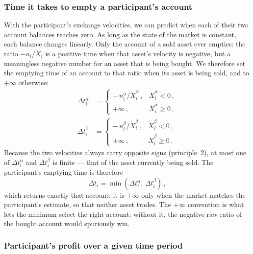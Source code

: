 \documentclass[letterpaper]{article}
\begin{document}
\subsubsection{Time it takes to empty a participant's account}

With the participant's exchange velocities, we can predict when each of their two account balances reaches zero. As long as the state of the market is constant, each balance changes linearly. Only the account of a sold asset ever empties: the ratio $-n_i/\dot{X}_i$ is a positive time when that asset's velocity is negative, but a meaningless negative number for an asset that is being bought. We therefore set the emptying time of an account to that ratio when its asset is being sold, and to $+\infty$ otherwise:
\begin{align}
    \Delta t_i^\alpha &= \begin{cases} -\, n_i^\alpha / \dot{X}_i^\alpha \,, & \dot{X}_i^\alpha < 0 \,,\\ +\infty \,, & \dot{X}_i^\alpha \geq 0 \,, \end{cases} \nonumber\\
    \Delta t_i^\beta &= \begin{cases} -\, n_i^\beta / \dot{X}_i^\beta \,, & \dot{X}_i^\beta < 0 \,,\\ +\infty \,, & \dot{X}_i^\beta \geq 0 \,. \end{cases} \label{eqDeltaT}
\end{align}
Because the two velocities always carry opposite signs (principle~2), at most one of $\Delta t_i^\alpha$ and $\Delta t_i^\beta$ is finite --- that of the asset currently being sold. The participant's emptying time is therefore
\begin{equation}
    \Delta t_i = \min\!\left(\Delta t_i^\alpha,\, \Delta t_i^\beta\right) \,,
\end{equation}
which returns exactly that account; it is $+\infty$ only when the market matches the participant's estimate, so that neither asset trades. The $+\infty$ convention is what lets the minimum select the right account: without it, the negative raw ratio of the bought account would spuriously win.

\subsubsection{Participant's profit over a given time period}\label{secParticipantProfit}
\end{document}
